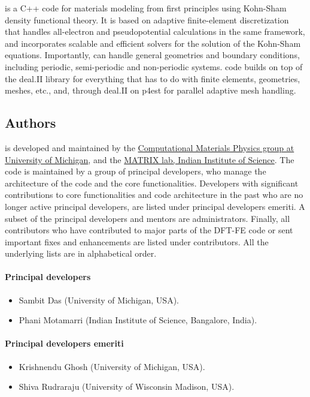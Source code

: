 \dftfe{} is a C++ code for materials modeling from first principles using Kohn-Sham density functional theory.
It is based on adaptive finite-element discretization that handles all-electron and pseudopotential calculations in the 
same framework, and incorporates scalable and efficient solvers for the solution of the Kohn-Sham equations. Importantly, \dftfe{} 
can handle general geometries and boundary conditions, including periodic, semi-periodic and non-periodic systems. \dftfe{} code 
builds on top of the deal.II library for everything that has to do with finite elements, geometries, meshes, etc., and, through 
deal.II on p4est for parallel adaptive mesh handling.

\subsection{Authors}
\label{sec:authors}
\dftfe{} is developed and maintained by the \href{http://www-personal.umich.edu/~vikramg/}{Computational Materials Physics
group at University of Michigan}, and the \href{https://sites.google.com/view/matrix-lab}{MATRIX lab, Indian Institute of Science}. The code is maintained by a group of principal developers, 
who manage the architecture of the code and the core functionalities. Developers with
significant contributions to core functionalities and code architecture in the past who are 
no longer active principal developers, are listed under principal developers emeriti. 
A subset of the principal developers and mentors are administrators. Finally, all contributors who have
contributed to major parts of the DFT-FE code or sent important fixes and enhancements are listed
under contributors. All the underlying lists are in alphabetical order. 

\paragraph{Principal developers}
\begin{itemize}
	\item Sambit Das (University of Michigan, USA).
	\item Phani Motamarri (Indian Institute of Science, Bangalore, India).
\end{itemize}

\paragraph{Principal developers emeriti}
\begin{itemize}
	\item Krishnendu Ghosh (University of Michigan, USA).
	\item Shiva Rudraraju (University of Wisconsin Madison, USA).	
\end{itemize}

